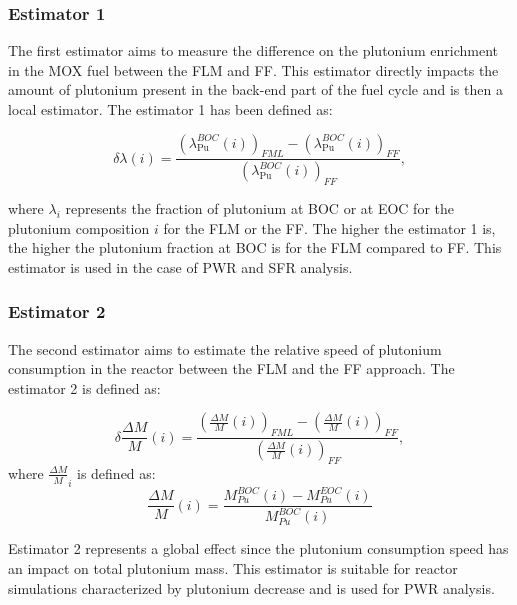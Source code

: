 \subsubsection{Estimator 1}
The first estimator aims to measure the difference on the plutonium enrichment in the MOX
fuel between the \gls{FLM} and \gls{FF}. This estimator directly impacts the amount of
plutonium present in the back-end part of the fuel cycle and is then a local estimator. The estimator 1 has been defined as:

\begin{equation}
    \delta{\lambda}(i) =
        \frac{\left(\lambda_{\mathrm{Pu}}^{BOC}(i)\right)_{FML}
              - \left(\lambda_{\mathrm{Pu}}^{BOC}(i)\right)_{FF}}
              {\left(\lambda_{\mathrm{Pu}}^{BOC}(i)\right)_{FF}},
\end{equation}

where $\lambda_i$ represents the fraction of plutonium at \gls{BOC} or at
\gls{EOC} for the plutonium composition $i$ for the \gls{FLM} or the \gls{FF}. The higher the estimator 1 is, the higher the plutonium fraction at \gls{BOC} is for the \gls{FLM} compared to \gls{FF}. This estimator is used in the case of \gls{PWR} and \gls{SFR} analysis.

\subsubsection{Estimator 2}

The second estimator aims to estimate the relative speed of plutonium consumption in the reactor between the \gls{FLM} and the \gls{FF} approach. The estimator 2 is defined as:

\begin{equation}
    \delta{\frac{\Delta M}{M}}(i) =
        \frac{\left(\frac{\Delta M}{M}(i)\right)_{FML}
              - \left(\frac{\Delta M}{M}(i)\right)_{FF}}
             {\left(\frac{\Delta M}{M}(i)\right)_{FF}},
\end{equation}
where $\frac{\Delta M}{M}_{i}$ is defined as:
\begin{equation}
    \frac{\Delta M}{M}(i) = \frac{M_{Pu}^{BOC}(i) -
    M_{Pu}^{EOC}(i)}{M_{Pu}^{BOC}(i)}
\end{equation}

Estimator 2 represents a global effect since the plutonium consumption speed has an impact on total plutonium mass. This estimator is suitable for reactor simulations characterized by plutonium decrease and is used for PWR analysis.

